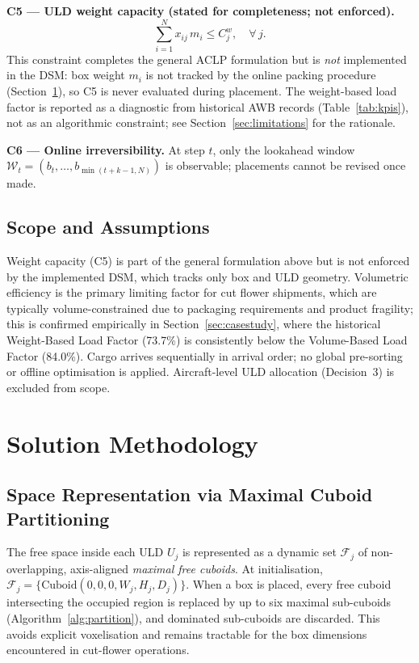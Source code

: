 \documentclass[12pt,a4paper]{article}
\begin{document}
\textbf{C5 --- ULD weight capacity (stated for completeness; not enforced).}
\begin{equation}
\label{eq:c5}
\sum_{i=1}^{N} x_{ij}\, m_i \leq C_j^w, \quad \forall\, j.
\end{equation}
This constraint completes the general ACLP formulation but is
\emph{not} implemented in the DSM: box weight $m_i$ is not tracked by
the online packing procedure (Section~\ref{sec:method}), so C5 is
never evaluated during placement.
The weight-based load factor is reported as a diagnostic from
historical AWB records (Table~\ref{tab:kpis}), not as an algorithmic
constraint; see Section~\ref{sec:limitations} for the rationale.

\textbf{C6 --- Online irreversibility.}
At step $t$, only the lookahead window
$\mathcal{W}_t = (b_t, \ldots, b_{\min(t+k-1,N)})$
is observable; placements cannot be revised once made.

\subsection{Scope and Assumptions}

Weight capacity (C5) is part of the general formulation above but is
not enforced by the implemented DSM, which tracks only box and ULD
geometry.
Volumetric efficiency is the primary limiting factor for cut flower
shipments, which are typically volume-constrained due to packaging
requirements and product fragility; this is confirmed empirically in
Section~\ref{sec:casestudy}, where the historical Weight-Based Load
Factor (73.7\%) is consistently below the Volume-Based Load Factor
(84.0\%).
Cargo arrives sequentially in arrival order; no global pre-sorting or
offline optimisation is applied.
Aircraft-level ULD allocation (Decision~3) is excluded from scope.


\section{Solution Methodology}
\label{sec:method}

\subsection{Space Representation via Maximal Cuboid Partitioning}
\label{sec:space}

The free space inside each ULD $U_j$ is represented as a dynamic set
$\mathcal{F}_j$ of non-overlapping, axis-aligned \emph{maximal free
cuboids}.
At initialisation,
$\mathcal{F}_j = \{\mathrm{Cuboid}(0,0,0,W_j,H_j,D_j)\}$.
When a box is placed, every free cuboid intersecting the occupied
region is replaced by up to six maximal sub-cuboids
(Algorithm~\ref{alg:partition}), and dominated sub-cuboids are
discarded.
This avoids explicit voxelisation and remains tractable for the box
dimensions encountered in cut-flower operations.
\end{document}
